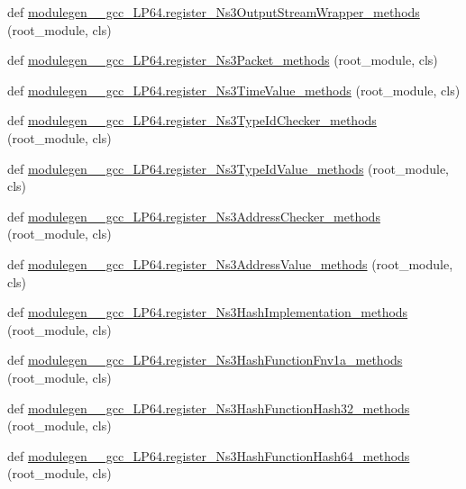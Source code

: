 \begin{DoxyCompactItemize}
\item 
def \hyperlink{namespacemodulegen____gcc__LP64_acc3c2935e4b09f91d6a35d059f746a4a}{modulegen\+\_\+\+\_\+gcc\+\_\+\+L\+P64.\+register\+\_\+\+Ns3\+Output\+Stream\+Wrapper\+\_\+methods} (root\+\_\+module, cls)
\item 
def \hyperlink{namespacemodulegen____gcc__LP64_a6784a1ccebf471415830ba331480b02c}{modulegen\+\_\+\+\_\+gcc\+\_\+\+L\+P64.\+register\+\_\+\+Ns3\+Packet\+\_\+methods} (root\+\_\+module, cls)
\item 
def \hyperlink{namespacemodulegen____gcc__LP64_a074f52c8db74b3898d974bf33a0240f8}{modulegen\+\_\+\+\_\+gcc\+\_\+\+L\+P64.\+register\+\_\+\+Ns3\+Time\+Value\+\_\+methods} (root\+\_\+module, cls)
\item 
def \hyperlink{namespacemodulegen____gcc__LP64_aaf5d00575008532556e0df2d3b8d5bef}{modulegen\+\_\+\+\_\+gcc\+\_\+\+L\+P64.\+register\+\_\+\+Ns3\+Type\+Id\+Checker\+\_\+methods} (root\+\_\+module, cls)
\item 
def \hyperlink{namespacemodulegen____gcc__LP64_ab25f30f66f8ae8da64444bac683dac7c}{modulegen\+\_\+\+\_\+gcc\+\_\+\+L\+P64.\+register\+\_\+\+Ns3\+Type\+Id\+Value\+\_\+methods} (root\+\_\+module, cls)
\item 
def \hyperlink{namespacemodulegen____gcc__LP64_a89e9f561a2c1e1e454b475d69805122f}{modulegen\+\_\+\+\_\+gcc\+\_\+\+L\+P64.\+register\+\_\+\+Ns3\+Address\+Checker\+\_\+methods} (root\+\_\+module, cls)
\item 
def \hyperlink{namespacemodulegen____gcc__LP64_afbde1a3f3b1b9e58c7c95df3cbbef1ae}{modulegen\+\_\+\+\_\+gcc\+\_\+\+L\+P64.\+register\+\_\+\+Ns3\+Address\+Value\+\_\+methods} (root\+\_\+module, cls)
\item 
def \hyperlink{namespacemodulegen____gcc__LP64_afdc62559dc296b925757fa93e7cd4260}{modulegen\+\_\+\+\_\+gcc\+\_\+\+L\+P64.\+register\+\_\+\+Ns3\+Hash\+Implementation\+\_\+methods} (root\+\_\+module, cls)
\item 
def \hyperlink{namespacemodulegen____gcc__LP64_ae9b88db2dea3c59f886d0be14d039694}{modulegen\+\_\+\+\_\+gcc\+\_\+\+L\+P64.\+register\+\_\+\+Ns3\+Hash\+Function\+Fnv1a\+\_\+methods} (root\+\_\+module, cls)
\item 
def \hyperlink{namespacemodulegen____gcc__LP64_a9e34b1934e0920db80354937fe083ff8}{modulegen\+\_\+\+\_\+gcc\+\_\+\+L\+P64.\+register\+\_\+\+Ns3\+Hash\+Function\+Hash32\+\_\+methods} (root\+\_\+module, cls)
\item 
def \hyperlink{namespacemodulegen____gcc__LP64_a082871bd62d0a4db1581a4a5a90ef0ac}{modulegen\+\_\+\+\_\+gcc\+\_\+\+L\+P64.\+register\+\_\+\+Ns3\+Hash\+Function\+Hash64\+\_\+methods} (root\+\_\+module, cls)

\end{DoxyCompactItemize}
